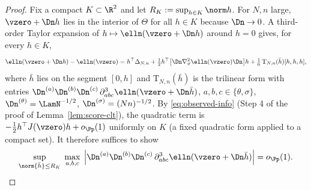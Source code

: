 \closuredraft
\begin{proof}
Fix a compact $K\subset\R^2$ and let $R_K:=\sup_{h\in K}\norm h$. For $N,n$
large, $\vzero+\Dn h$ lies in the interior of $\Theta$ for all $h\in K$
because $\Dn\to0$. A third-order Taylor expansion of
$h\mapsto\elln(\vzero+\Dn h)$ around $h=0$ gives, for every $h\in K$,
\begin{equation}\label{eq:rem-taylor}
 \elln(\vzero+\Dn h)-\elln(\vzero)
 =h^\top\Delta_{N,n}
 +\tfrac12 h^\top\big[\Dn\nabla^2_\vartheta\elln(\vzero)\Dn\big]h
 +\tfrac16\,\mathrm T_{N,n}(\bar h)[h,h,h],
\end{equation}
where $\bar h$ lies on the segment $[0,h]$ and $\mathrm T_{N,n}(\bar h)$ is
the trilinear form with entries
$\Dn^{(a)}\Dn^{(b)}\Dn^{(c)}\,
\partial^3_{abc}\elln(\vzero+\Dn\bar h)$, $a,b,c\in\{\theta,\sigma\}$,
$\Dn^{(\theta)}=\LamN^{-1/2}$, $\Dn^{(\sigma)}=(Nn)^{-1/2}$.
By \eqref{eq:observed-info} (Step 4 of the proof of Lemma~\ref{lem:score-clt}),
the quadratic term is $-\frac12h^\top J(\vzero)h+o_{\Pp}(1)$ uniformly on $K$
(a fixed quadratic form applied to a compact set). It therefore suffices to
show
\begin{equation}\label{eq:rem-goal}
 \sup_{\norm{\bar h}\le R_K}\;
 \max_{a,b,c}\;
 \Big|\Dn^{(a)}\Dn^{(b)}\Dn^{(c)}\,
 \partial^3_{abc}\elln(\vzero+\Dn\bar h)\Big|
 =o_{\Pp}(1).
\end{equation}


\end{proof}
